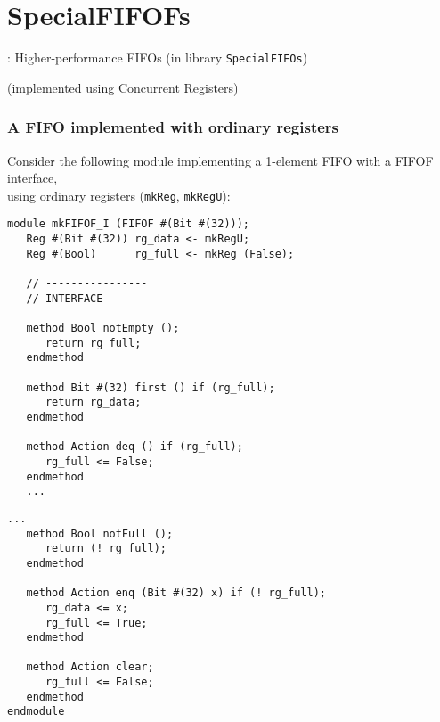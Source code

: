 
\section{SpecialFIFOFs}

\begin{frame}

\begin{center}
  {\LARGE {\BSV}: Higher-performance FIFOs (in library {\tt SpecialFIFOs})}

  \vspace{5ex}

  (implemented using Concurrent Registers)
\end{center}

\end{frame}


\begin{frame}[fragile]
\frametitle{A FIFO implemented with ordinary registers}

\footnotesize

Consider the following module implementing a 1-element FIFO with a
FIFOF interface, \\
using ordinary registers ({\tt mkReg}, {\tt mkRegU}):

\vspace{2ex}

\begin{center}
\begin{minipage}[t]{0.45\textwidth}\scriptsize
\begin{Verbatim}[frame=single]
module mkFIFOF_I (FIFOF #(Bit #(32)));
   Reg #(Bit #(32)) rg_data <- mkRegU;
   Reg #(Bool)      rg_full <- mkReg (False);

   // ----------------
   // INTERFACE

   method Bool notEmpty ();
      return rg_full;
   endmethod

   method Bit #(32) first () if (rg_full);
      return rg_data;
   endmethod

   method Action deq () if (rg_full);
      rg_full <= False;
   endmethod
   ...
\end{Verbatim}
\end{minipage}
\begin{minipage}[t]{0.45\textwidth}\scriptsize
\begin{Verbatim}[frame=single]
   ...
   method Bool notFull ();
      return (! rg_full);
   endmethod

   method Action enq (Bit #(32) x) if (! rg_full);
      rg_data <= x;
      rg_full <= True;
   endmethod

   method Action clear;
      rg_full <= False;
   endmethod
endmodule
\end{Verbatim}
\end{minipage}
\end{center}

\end{frame}

